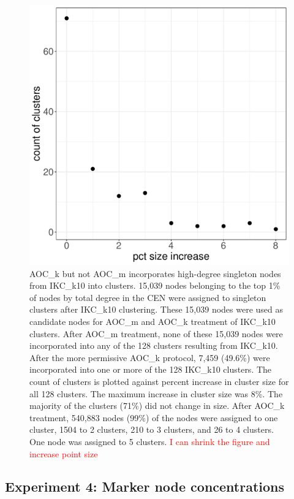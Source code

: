 \documentclass[12pt, oneside]{article}   	%
\begin{document}
	\begin{figure}[H]
		\centering
		\includegraphics[width=0.7\linewidth]{singletons.pdf} 
		\caption{AOC\_k but not AOC\_m incorporates high-degree singleton nodes from IKC\_k10 into clusters. 15,039 nodes belonging to the top  1\% of nodes by total degree in the CEN were assigned to singleton clusters after IKC\_k10 clustering. 
			These 15,039  nodes were used as candidate nodes for AOC\_m and AOC\_k treatment of IKC\_k10 clusters. After AOC\_m treatment, none of these 15,039 nodes were incorporated into any of the 128 clusters resulting from  IKC\_k10. After the more permissive AOC\_k protocol, 7,459 (49.6\%) were incorporated into one or more of the 128 IKC\_k10 clusters. The count of clusters is plotted against percent increase in cluster size for all 128 clusters. The maximum increase in cluster size was 8\%. The majority of the clusters (71\%) did not change in size. After AOC\_k treatment, 540,883 nodes (99\%) of the nodes were assigned to one cluster, 1504 to 2 clusters, 210 to 3 clusters, and 26 to 4 clusters. One node was assigned to 5 clusters. \textcolor{red}{I can shrink the figure and increase point size}}
		\label{fig:singleton}
	\end{figure}
	
	\subsection{Experiment 4: Marker node concentrations}
	
\end{document}
